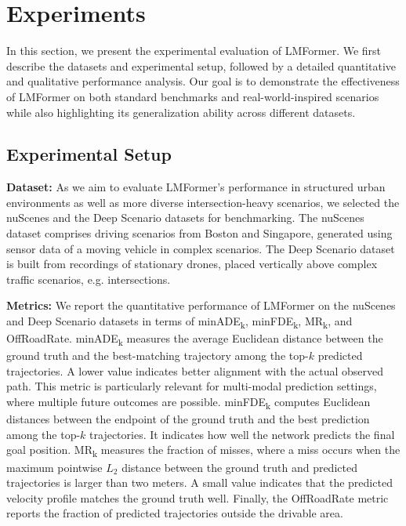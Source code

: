 \section{Experiments}\label{section:experiments}
In this section, we present the experimental evaluation of LMFormer. We first describe the datasets and experimental setup, followed by a detailed quantitative and qualitative performance analysis. Our goal is to demonstrate the effectiveness of LMFormer on both standard benchmarks and real-world-inspired scenarios while also highlighting its generalization ability across different datasets.

\subsection{Experimental Setup}\label{subsection:exp_setup}
\textbf{Dataset:} As we aim to evaluate LMFormer’s performance in structured urban environments as well as more diverse intersection-heavy scenarios, we selected the nuScenes \cite{caesar2020nuscenes} and the Deep Scenario \cite{lu2023deepscenario} datasets for benchmarking. The nuScenes dataset comprises driving scenarios from Boston and Singapore, generated using sensor data of a moving vehicle in complex scenarios. The Deep Scenario dataset is built from recordings of stationary drones, placed vertically above complex traffic scenarios, e.g. intersections.

\noindent\textbf{Metrics:} We report the quantitative performance of LMFormer on the nuScenes and Deep Scenario datasets in terms of minADE\textsubscript{k}, minFDE\textsubscript{k}, MR\textsubscript{k}, and OffRoadRate. minADE\textsubscript{k} measures the average Euclidean distance between the ground truth and the best-matching trajectory among the top-$k$ predicted trajectories. A lower value indicates better alignment with the actual observed path. This metric is particularly relevant for multi-modal prediction settings, where multiple future outcomes are possible. minFDE\textsubscript{k} computes Euclidean distances between the endpoint of the ground truth and the best prediction among the top-$k$ trajectories. It indicates how well the network predicts the final goal position. MR\textsubscript{k} measures the fraction of misses, where a miss occurs when the maximum pointwise $L_2$ distance between the ground truth and predicted trajectories is larger than two meters. A small value indicates that the predicted velocity profile matches the ground truth well. Finally, the OffRoadRate metric reports the fraction of predicted trajectories outside the drivable area.

